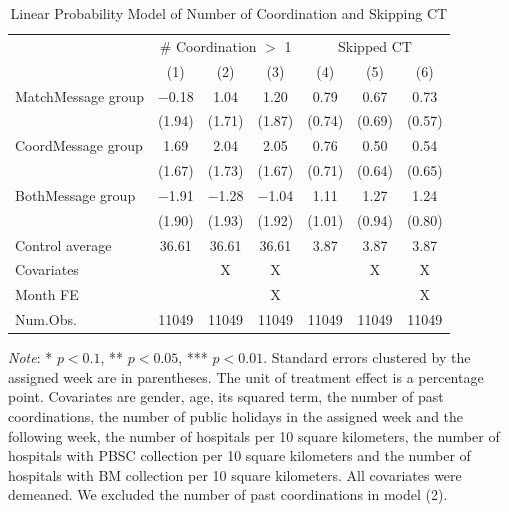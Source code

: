\documentclass[12pt, a4paper]{article}
\begin{document}
\begin{table}[H]

\caption{\label{tab:lm-skip}Linear Probability Model of Number of Coordination and Skipping CT}
\centering
\fontsize{8}{10}\selectfont
\begin{threeparttable}
\begin{tabular}[t]{lcccccc}
\toprule
\multicolumn{1}{c}{ } & \multicolumn{3}{c}{\# Coordination $>$ 1} & \multicolumn{3}{c}{Skipped CT} \\
\cmidrule(l{3pt}r{3pt}){2-4} \cmidrule(l{3pt}r{3pt}){5-7}
  & (1) & (2) & (3) & (4) & (5) & (6)\\
\midrule
MatchMessage group & \num{-0.18} & \num{1.04} & \num{1.20} & \num{0.79} & \num{0.67} & \num{0.73}\\
 & (\num{1.94}) & (\num{1.71}) & (\num{1.87}) & (\num{0.74}) & (\num{0.69}) & (\num{0.57})\\
CoordMessage group & \num{1.69} & \num{2.04} & \num{2.05} & \num{0.76} & \num{0.50} & \num{0.54}\\
 & (\num{1.67}) & (\num{1.73}) & (\num{1.67}) & (\num{0.71}) & (\num{0.64}) & (\num{0.65})\\
BothMessage group & \num{-1.91} & \num{-1.28} & \num{-1.04} & \num{1.11} & \num{1.27} & \num{1.24}\\
 & (\num{1.90}) & (\num{1.93}) & (\num{1.92}) & (\num{1.01}) & (\num{0.94}) & (\num{0.80})\\
\midrule
Control average & 36.61 & 36.61 & 36.61 & 3.87 & 3.87 & 3.87\\
Covariates &  & X & X &  & X & X\\
Month FE &  &  & X &  &  & X\\
Num.Obs. & \num{11049} & \num{11049} & \num{11049} & \num{11049} & \num{11049} & \num{11049}\\
\bottomrule
\end{tabular}
\begin{tablenotes}
\item \emph{Note}: * $p < 0.1$, ** $p < 0.05$, *** $p < 0.01$. Standard errors clustered by the assigned week are in parentheses. The unit of treatment effect is a percentage point. Covariates are gender, age, its squared term, the number of past coordinations, the number of public holidays in the assigned week and the following week, the number of hospitals per 10 square kilometers, the number of hospitals with PBSC collection per 10 square kilometers and the number of hospitals with BM collection per 10 square kilometers. All covariates were demeaned. We excluded the number of past coordinations in model (2).
\end{tablenotes}
\end{threeparttable}
\end{table}
\end{document}
